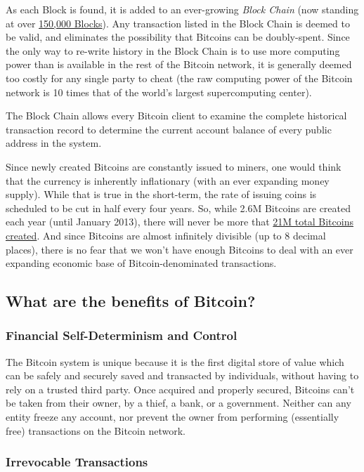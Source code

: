 \documentclass[12pt,twocolumn]{article}
\begin{document}
As each Block is found, it is added to an ever-growing \emph{Block
Chain} (now standing at over
\href{http://btcserv.net/bitcoin/history/}{150,000 Blocks}). Any
transaction listed in the Block Chain is deemed to be valid, and
eliminates the possibility that Bitcoins can be doubly-spent. Since the
only way to re-write history in the Block Chain is to use more computing
power than is available in the rest of the Bitcoin network, it is
generally deemed too costly for any single party to cheat (the raw
computing power of the Bitcoin network is 10 times that of the world's
largest supercomputing center).

The Block Chain allows every Bitcoin client to examine the complete
historical transaction record to determine the current account balance
of every public address in the system.

Since newly created Bitcoins are constantly issued to miners, one would
think that the currency is inherently inflationary (with an ever
expanding money supply). While that is true in the short-term, the rate
of issuing coins is scheduled to be cut in half every four years. So,
while 2.6M Bitcoins are created each year (until January 2013), there
will never be more that
\href{https://en.bitcoin.it/wiki/File:Total\_bitcoins\_over\_time\_graph.png}{21M
total Bitcoins created}. And since Bitcoins are almost infinitely
divisible (up to 8 decimal places), there is no fear that we won't have
enough Bitcoins to deal with an ever expanding economic base of
Bitcoin-denominated transactions.

\subsection{What are the benefits of Bitcoin?}

\subsubsection{Financial Self-Determinism and Control}

The Bitcoin system is unique because it is the first digital store of
value which can be safely and securely saved and transacted by
individuals, without having to rely on a trusted third party. Once
acquired and properly secured, Bitcoins can't be taken from their owner,
by a thief, a bank, or a government. Neither can any entity freeze any
account, nor prevent the owner from performing (essentially free)
transactions on the Bitcoin network.

\subsubsection{Irrevocable Transactions}
\end{document}
